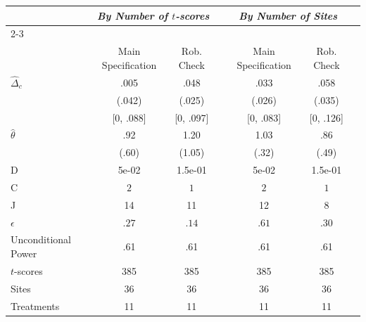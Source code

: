 \begin{tabular}{l c c c c c c }
\hline \hline 
 & \multicolumn{2}{c}{\textit{By Number of $t$-scores}} &  &\multicolumn{2}{c}{\textit{By Number of Sites}} & \\
\cline{2-3} \cline{5-6} 
\\ & Main Specification & Rob. Check &  & Main Specification & Rob. Check & \\
\hline
 $\hat{\Delta}_c$ & .005 & .048 & & .033 & .058 & \\
& (.042) & (.025) & & (.026) & (.035) & \\
 &  [0, .088] & [0, .097] & & [0, .083] & [0, .126] & \\
    \hline 
  $\hat{\theta}$ & .92 & 1.20 & & 1.03 & .86 & \\
 & (.60) & (1.05) & & (.32) & (.49) & \\
 \hline  
 D  &  5e-02 &  1.5e-01 & & 5e-02 & 1.5e-01 & \\
  C  &  $2$ & $1$ & & $2$ & $1$ & \\
  J    & 14 & 11 & & 12& 8 & \\
  $\epsilon$  & $.27$ & $.14$ & &  $.61$ & $.30$ & \\
 \hline
     Unconditional Power & .61 & .61 &  & .61 &.61 & \\
  $t$-scores & 385 & 385 & & 385 & 385 & \\
  Sites & 36& 36 & & 36 & 36 & \\
  Treatments & 11 & 11& & 11 & 11 & \\
\hline
\end{tabular}
